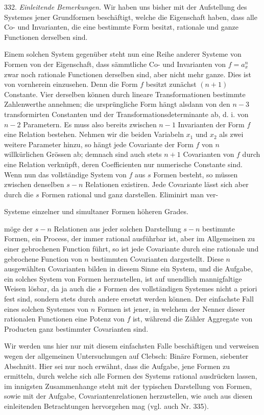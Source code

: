 332. \textit{Einleitende Bemerkungen.} Wir haben uns bisher mit der Aufstellung des Systemes jener Grundformen beschäftigt, welche die Eigenschaft haben, dass alle Co- und Invarianten, die eine bestimmte Form besitzt, rationale und ganze Functionen derselben sind.

Einem solchen System gegenüber steht nun eine Reihe anderer Systeme von Formen von der Eigenschaft, dass sämmtliche Co- und Invarianten von $f = a_x^n$ zwar noch rationale Functionen derselben sind, aber nicht mehr ganze. Dies ist von vornherein einzusehen. Denn die Form $f$ besitzt zunächst $(n+1)$ Constante. Vier derselben können durch lineare Transformationen bestimmte Zahlenwerthe annehmen; die ursprüngliche Form hängt alsdann von den $n - 3$ transformirten Constanten und der Transformationsdeterminante ab, d. i. von $n - 2$ Parametern. Es muss also bereits zwischen $n - 1$ Invarianten der Form $f$ eine Relation bestehen. Nehmen wir die beiden Variabeln $x_1$ und $x_2$ als zwei weitere Parameter hinzu, so hängt jede Covariante der Form $f$ von $n$ willkürlichen Grössen ab; demnach sind auch stets $n + 1$ Covarianten von $f$ durch eine Relation verknüpft, deren Coefficienten nur numerische Constante sind. Wenn nun das vollständige System von $f$ aus $s$ Formen besteht, so müssen zwischen denselben $s - n$ Relationen existiren. Jede Covariante lässt sich aber durch die $s$ Formen rational und ganz darstellen. Eliminirt man ver-


Systeme einzelner und simultaner Formen höheren Grades.

möge der $s - n$ Relationen aus jeder solchen Darstellung $s - n$ bestimmte Formen, ein Process, der immer rational ausführbar ist, aber im Allgemeinen zu einer gebrochenen Function führt, so ist jede Covariante durch eine rationale und gebrochene Function von $n$ bestimmten Covarianten dargestellt. Diese $n$ ausgewählten Covarianten bilden in diesem Sinne ein System, und die Aufgabe, ein solches System von Formen herzustellen, ist auf unendlich mannigfaltige Weisen lösbar, da ja auch die $s$ Formen des vollständigen Systemes nicht a priori fest sind, sondern stets durch andere ersetzt werden können. Der einfachste Fall eines solchen Systemes von $n$ Formen ist jener, in welchem der Nenner dieser rationalen Functionen eine Potenz von $f$ ist, während die Zähler Aggregate von Producten ganz bestimmter Covarianten sind.

Wir werden uns hier nur mit diesem einfachsten Falle beschäftigen und verweisen wegen der allgemeinen Untersuchungen auf Clebsch: \glqq Binäre Formen\grqq{}, siebenter Abschnitt. Hier sei nur noch erwähnt, dass die Aufgabe, jene Formen zu ermitteln, durch welche sich alle Formen des Systems rational ausdrücken lassen, im innigsten Zusammenhange steht mit der typischen Darstellung von Formen, sowie mit der Aufgabe, Covariantenrelationen herzustellen, wie auch aus diesen einleitenden Betrachtungen hervorgehen mag (vgl. auch Nr. 335).

